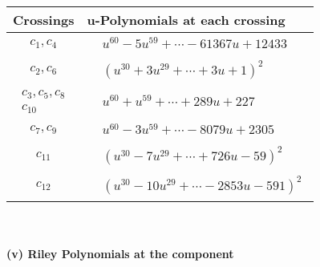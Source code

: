 \documentclass[1p]{elsarticle_modified}
\theoremstyle{definition}
\begin{document}
\begin{tabular}{m{50pt}|m{274pt}}
Crossings & \hspace{64pt}u-Polynomials at each crossing \\
\hline $$\begin{aligned}c_{1},c_{4}\end{aligned}$$&$\begin{aligned}
&u^{60}-5 u^{59}+\cdots-61367 u+12433
\end{aligned}$\\
\hline $$\begin{aligned}c_{2},c_{6}\end{aligned}$$&$\begin{aligned}
&(u^{30}+3 u^{29}+\cdots+3 u+1)^{2}
\end{aligned}$\\
\hline $$\begin{aligned}c_{3},c_{5},c_{8}\\c_{10}\end{aligned}$$&$\begin{aligned}
&u^{60}+u^{59}+\cdots+289 u+227
\end{aligned}$\\
\hline $$\begin{aligned}c_{7},c_{9}\end{aligned}$$&$\begin{aligned}
&u^{60}-3 u^{59}+\cdots-8079 u+2305
\end{aligned}$\\
\hline $$\begin{aligned}c_{11}\end{aligned}$$&$\begin{aligned}
&(u^{30}-7 u^{29}+\cdots+726 u-59)^{2}
\end{aligned}$\\
\hline $$\begin{aligned}c_{12}\end{aligned}$$&$\begin{aligned}
&(u^{30}-10 u^{29}+\cdots-2853 u-591)^{2}
\end{aligned}$\\
\hline
\end{tabular}\\~\\
\newpage\renewcommand{\arraystretch}{1}
\flushleft \textbf{(v) Riley Polynomials at the component}\newline \\
\end{document}
